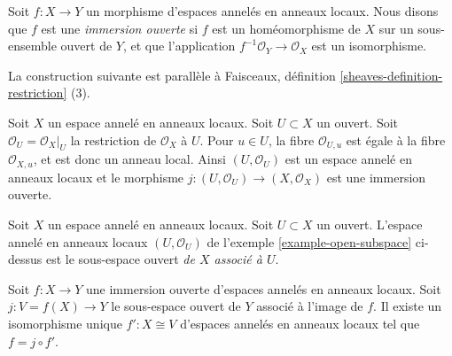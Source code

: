 \begin{definition}
\label{definition-immersion-locally-ringed-spaces}
Soit $f : X \to Y$ un morphisme d'espaces annelés en anneaux locaux.
Nous disons que $f$ est une {\it immersion ouverte} si
$f$ est un homéomorphisme de $X$ sur un sous-ensemble ouvert
de $Y$, et que l'application $f^{-1}\mathcal{O}_Y \to \mathcal{O}_X$
est un isomorphisme.
\end{definition}

\noindent
La construction suivante est parallèle à
Faisceaux, définition \ref{sheaves-definition-restriction} (3).

\begin{example}
\label{example-open-subspace}
Soit $X$ un espace annelé en anneaux
locaux. Soit $U \subset X$ un ouvert.
Soit $\mathcal{O}_U = \mathcal{O}_X|_U$
la restriction de $\mathcal{O}_X$ à $U$. Pour $u
\in U$, la fibre $\mathcal{O}_{U, u}$ est égale
à la fibre $\mathcal{O}_{X, u}$, et est donc un anneau local.
Ainsi $(U, \mathcal{O}_U)$ est un espace annelé en anneaux
locaux et le morphisme $j : (U, \mathcal{O}_U) \to (X, \mathcal{O}_X)$ est
une immersion ouverte.
\end{example}

\begin{definition}
\label{definition-open-subspace}
Soit $X$ un espace annelé en anneaux
locaux. Soit $U \subset X$ un ouvert.
L'espace annelé en anneaux locaux $(U, \mathcal{O}_U)$
de l'exemple \ref{example-open-subspace} ci-dessus
est le sous-espace ouvert {\it de $X$ associé à $U$}.
\end{definition}

\begin{lemma}
\label{lemma-open-immersion}
Soit $f : X \to Y$ une immersion ouverte d'espaces
annelés en anneaux locaux. Soit $j : V = f(X)
\to Y$ le sous-espace ouvert de $Y$ associé à l'image de $f$. Il
existe un isomorphisme unique $f' : X \cong V$ d'espaces
annelés en anneaux locaux tel que $f = j \circ f'$.
\end{lemma}

